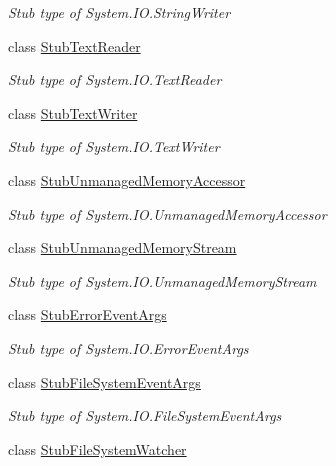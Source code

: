 \begin{DoxyCompactItemize}
\begin{DoxyCompactList}\small\item\em Stub type of System.\-I\-O.\-String\-Writer\end{DoxyCompactList}\item 
class \hyperlink{class_system_1_1_i_o_1_1_fakes_1_1_stub_text_reader}{Stub\-Text\-Reader}
\begin{DoxyCompactList}\small\item\em Stub type of System.\-I\-O.\-Text\-Reader\end{DoxyCompactList}\item 
class \hyperlink{class_system_1_1_i_o_1_1_fakes_1_1_stub_text_writer}{Stub\-Text\-Writer}
\begin{DoxyCompactList}\small\item\em Stub type of System.\-I\-O.\-Text\-Writer\end{DoxyCompactList}\item 
class \hyperlink{class_system_1_1_i_o_1_1_fakes_1_1_stub_unmanaged_memory_accessor}{Stub\-Unmanaged\-Memory\-Accessor}
\begin{DoxyCompactList}\small\item\em Stub type of System.\-I\-O.\-Unmanaged\-Memory\-Accessor\end{DoxyCompactList}\item 
class \hyperlink{class_system_1_1_i_o_1_1_fakes_1_1_stub_unmanaged_memory_stream}{Stub\-Unmanaged\-Memory\-Stream}
\begin{DoxyCompactList}\small\item\em Stub type of System.\-I\-O.\-Unmanaged\-Memory\-Stream\end{DoxyCompactList}\item 
class \hyperlink{class_system_1_1_i_o_1_1_fakes_1_1_stub_error_event_args}{Stub\-Error\-Event\-Args}
\begin{DoxyCompactList}\small\item\em Stub type of System.\-I\-O.\-Error\-Event\-Args\end{DoxyCompactList}\item 
class \hyperlink{class_system_1_1_i_o_1_1_fakes_1_1_stub_file_system_event_args}{Stub\-File\-System\-Event\-Args}
\begin{DoxyCompactList}\small\item\em Stub type of System.\-I\-O.\-File\-System\-Event\-Args\end{DoxyCompactList}\item 
class \hyperlink{class_system_1_1_i_o_1_1_fakes_1_1_stub_file_system_watcher}{Stub\-File\-System\-Watcher}

\end{DoxyCompactItemize}
